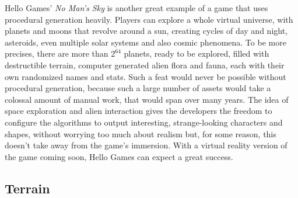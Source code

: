 Hello Games' \textit{No Man's Sky} is another great example of a game that uses procedural generation heavily. Players can explore a whole virtual universe, with planets and moons that revolve around a sun, creating cycles of day and night, asteroids, even multiple solar systems and also cosmic phenomena. To be more precises, there are more than \(2^{64}\) planets, ready to be explored, filled with destructible terrain, computer generated alien flora and fauna, each with their own randomized names and stats. Such a feat would never be possible without procedural generation, because such a large number of assets would take a colossal amount of manual work, that would span over many years. The idea of space exploration and alien interaction gives the developers the freedom to configure the algorithms to output interesting, strange-looking characters and shapes, without worrying too much about realism but, for some reason, this doesn't take away from the game's immersion. With a virtual reality version of the game coming soon, Hello Games can expect a great success.

\subsection{Terrain}

